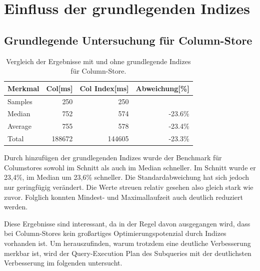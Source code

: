 \section{Einfluss der grundlegenden Indizes}\label{auswertung:basic_indizes}

\subsection{Grundlegende Untersuchung für Column-Store}

\begin{table}[H]
\centering
    \begin{tabularx}{\textwidth}{lrrr}
        \toprule
        Merkmal             &   Col[ms]    &    Col Index[ms] & Abweichung[\%]\\
        \toprule
        Samples             &   250        &   250      &        \\
        \midrule    
        Median              &   752        &   574      & -23.6\%\\
        Average             &   755        &   578      & -23.4\%\\
        Total               &   188672     &   144605   & -23.3\%\\
        \bottomrule
    \end{tabularx}
\caption{Vergleich der Ergebnisse mit und ohne grundlegende Indizes für Column-Store.}
\label{tab:basic_index_col}
\end{table}

Durch hinzufügen der grundlegenden Indizes wurde der Benchmark
für Columstores sowohl im Schnitt als auch im Median schneller.
Im Schnitt wurde er 23,4\%, im Median um 23,6\% schneller.
Die Standardabweichung hat sich jedoch nur geringfügig verändert.
Die Werte streuen relativ gesehen also gleich stark wie zuvor.
Folglich konnten Mindest- und Maximallaufzeit auch deutlich reduziert werden. 

Diese Ergebnisse sind interessant, da in der Regel davon ausgegangen wird, 
dass bei Column-Stores kein großartiges Optimierungspotenzial durch Indizes vorhanden ist.
Um herauszufinden, warum trotzdem eine deutliche Verbesserung merkbar ist,
wird der Query-Execution Plan des Subqueries mit der deutlichsten Verbesserung
im folgenden untersucht.

